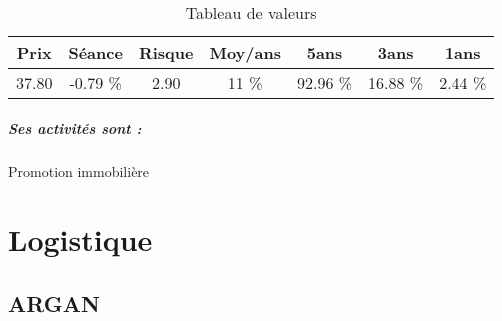 \documentclass[11pt,a4paper]{report}%
\begin{document}
\begin{table}[H]
  \centering
    \begin{tabular}{|c|c|c|c|c|c|c|}
    \hline
    Prix & Séance & Risque  & Moy/ans & 5ans & 3ans & 1ans \\
    \hline
    37.80 &    -0.79 \%    & 2.90 & 11 \% & 92.96 \% & 16.88 \% & 2.44 \% \\
    \hline
    \end{tabular}%
        \label{tab:table_KAUFMAN BROAD}%
      \caption{Tableau de valeurs}
\end{table}%

\paragraph{Ses activités sont : } Promotion immobilière 
    
    \newpage\chapter{Logistique}


\section{ARGAN}
\end{document}
